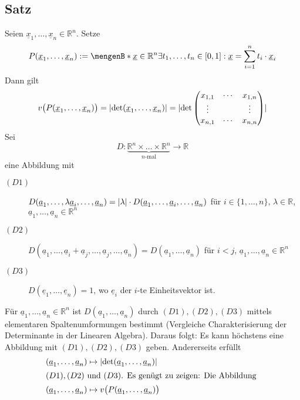 \subsection[Satz: Volumen eines Parallelotops]{Satz} %
\label{sub:515}
Seien $\underline{x}_1, \ldots , \underline{x}_n \in \mathds{R}^n$. Setze 
\[
	P(\underline{x}_1, \ldots , \underline{x}_n) := \set[\underline{x} \in \mathds{R}^n]{\exists t_1, \ldots , t_n \in [0,1] : \underline{x} = \sum_{i=1}^{n} t_i \cdot \underline{x}_i } 
\]
Dann gilt 
\[
	v\big(P(\underline{x}_1, \ldots , \underline{x}_n)\big) = \lvert\det (\underline{x}_1, \ldots , \underline{x}_n) \rvert = \lvert \det \begin{pmatrix}
		x_{1,1} & \cdots & x_{1,n} \\
		\vdots  & & \vdots  \\
		x_{n,1} & \cdots & x_{n,n}
	\end{pmatrix}\rvert 
\]
Sei 
\[
	D : \underbrace{\mathds{R}^n \times \ldots \times \mathds{R}^n}_{n \text{-mal}} \to \mathds{R} 
\]
eine Abbildung mit 
\begin{description}
	\item[$(D1)$] $D(\underline{a}_1, \ldots , \lambda \underline{a}_i, \ldots , \underline{a}_n) = \lvert\lambda \rvert \cdot D(\underline{a}_1, \ldots , \underline{a}_i, \ldots , \underline{a}_n) $ für $i \in \{1, \ldots , n\}$, $\lambda  \in \mathds{R}$, $\underline{a}_1, \ldots, \underline{a}_n \in \mathds{R}^n $
	\item[$(D2)$] $D(\underline{a}_1, \ldots , \underline{a}_i+ \underline{a}_j, \ldots , \underline{a}_j, \ldots , \underline{a}_n) = D(\underline{a}_1, \ldots , \underline{a}_n)$ für $i<j$, $\underline{a}_1, \ldots, \underline{a}_n \in \mathds{R}^n $
	\item[$(D3)$] $D(\underline{e}_1, \ldots , \underline{e}_n) = 1$, wo $\underline{e}_i $ der $i$-te Einheitsvektor ist.
\end{description}
Für $\underline{a}_1, \ldots , \underline{a}_n \in \mathds{R}^n$ ist $D(\underline{a}_1, \ldots , \underline{a}_n)$ durch $(D1), (D2), (D3)$ mittels elementaren 
Spaltenumformungen bestimmt (Vergleiche Charakterisierung der Determinante in der Linearen Algebra). Daraus folgt: Es kann höchstens eine Abbildung mit $(D1), (D2), (D3)$
geben. Andererseits erfüllt 
\begin{align*}
	(\underline{a}_1, \ldots , \underline{a}_n) &\mapsto \lvert\det (\underline{a}_1, \ldots , \underline{a}_n)\rvert \\
	\intertext{$(D1), (D2)$ und $(D3)$. Es genügt zu zeigen: Die Abbildung }
	(\underline{a}_1, \ldots , \underline{a}_n) &\mapsto v\big(P(\underline{a}_1, \ldots , \underline{a}_n)\big)
\end{align*}
